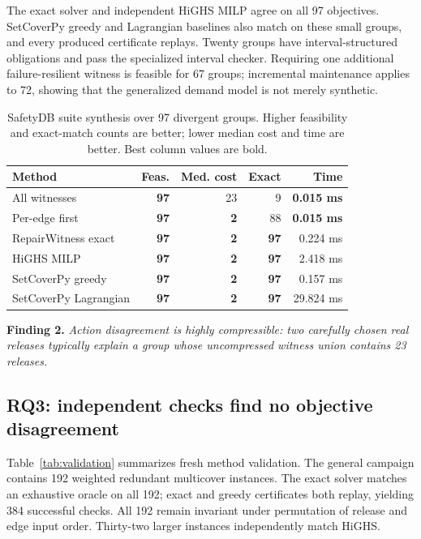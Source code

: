 \documentclass[10pt,conference]{IEEEtran}
\newcommand{\tblfont}{\footnotesize}
\begin{document}
The exact solver and independent HiGHS MILP agree on all 97 objectives. SetCoverPy greedy and Lagrangian baselines also match on these small groups, and every produced certificate replays. Twenty groups have interval-structured obligations and pass the specialized interval checker. Requiring one additional failure-resilient witness is feasible for 67 groups; incremental maintenance applies to 72, showing that the generalized demand model is not merely synthetic.

\begin{table}[t]
\centering
\caption{SafetyDB suite synthesis over 97 divergent groups. Higher feasibility and exact-match counts are better; lower median cost and time are better. Best column values are bold.}
\label{tab:safety-suite}
{\tblfont
\begin{tabularx}{\columnwidth}{@{}Yrrrr@{}}
\toprule
Method & Feas. & Med. cost & Exact & Time \\
\midrule
All witnesses & \textbf{97} & 23 & 9 & \textbf{0.015 ms} \\
Per-edge first & \textbf{97} & \textbf{2} & 88 & \textbf{0.015 ms} \\
RepairWitness exact & \textbf{97} & \textbf{2} & \textbf{97} & 0.224 ms \\
HiGHS MILP & \textbf{97} & \textbf{2} & \textbf{97} & 2.418 ms \\
SetCoverPy greedy & \textbf{97} & \textbf{2} & \textbf{97} & 0.157 ms \\
SetCoverPy Lagrangian & \textbf{97} & \textbf{2} & \textbf{97} & 29.824 ms \\
\bottomrule
\end{tabularx}}
\end{table}

\textbf{Finding 2.} \emph{Action disagreement is highly compressible: two carefully chosen real releases typically explain a group whose uncompressed witness union contains 23 releases.}

\subsection{RQ3: independent checks find no objective disagreement}
Table~\ref{tab:validation} summarizes fresh method validation. The general campaign contains 192 weighted redundant multicover instances. The exact solver matches an exhaustive oracle on all 192; exact and greedy certificates both replay, yielding 384 successful checks. All 192 remain invariant under permutation of release and edge input order. Thirty-two larger instances independently match HiGHS.
\end{document}

